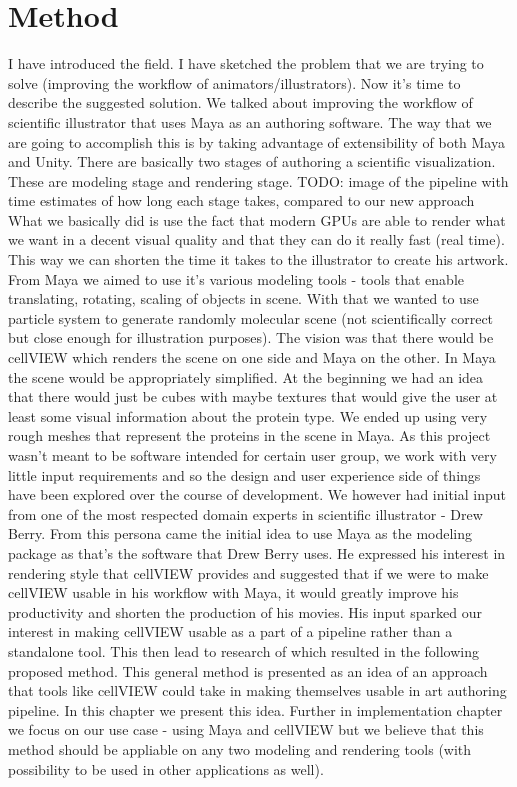 \documentclass[
  digital, %
  table,   %
  lof,     %
  lot,     %
]{fithesis3}
\begin{document}
\chapter{Method}
I have introduced the field. I have sketched the problem that we are trying to solve (improving the workflow of animators/illustrators). Now it's time to describe the suggested solution.
We talked about improving the workflow of scientific illustrator that uses Maya as an authoring software. The way that we are going to accomplish this is by taking advantage of extensibility of both Maya and Unity. 
There are basically two stages of authoring a scientific visualization. These are modeling stage and rendering stage. 
TODO: image of the pipeline with time estimates of how long each stage takes, compared to our new approach
What we basically did is use the fact that modern GPUs are able to render what we want in a decent visual quality and that they can do it really fast (real time). This way we can shorten the time it takes to the illustrator to create his artwork.
From Maya we aimed to use it's various modeling tools - tools that enable translating, rotating, scaling of objects in scene. With that we wanted to use particle system to generate randomly molecular scene (not scientifically correct but close enough for illustration purposes).
The vision was that there would be cellVIEW which renders the scene on one side and Maya on the other. In Maya the scene would be appropriately simplified. At the beginning we had an idea that there would just be cubes with maybe textures that would give the user at least some visual information about the protein type. We ended up using very rough meshes that represent the proteins in the scene in Maya.
As this project wasn't meant to be software intended for certain user group, we work with very little input requirements and so the design and user experience side of things have been explored over the course of development. We however had initial input from one of the most respected domain experts in scientific illustrator - Drew Berry. From this persona came the initial idea to use Maya as the modeling package as that's the software that Drew Berry uses. He expressed his interest in rendering style that cellVIEW provides and suggested that if we were to make cellVIEW usable in his workflow with Maya, it would greatly improve his productivity and shorten the production of his movies. His input sparked our interest in making cellVIEW usable as a part of a pipeline rather than a standalone tool. This then lead to research of which resulted in the following proposed method. This general method is presented as an idea of an approach that tools like cellVIEW could take in making themselves usable in art authoring pipeline. In this chapter we present this idea. Further in implementation chapter we focus on our use case - using Maya and cellVIEW but we believe that this method should be appliable on any two modeling and rendering tools (with possibility to be used in other applications as well).
\end{document}
